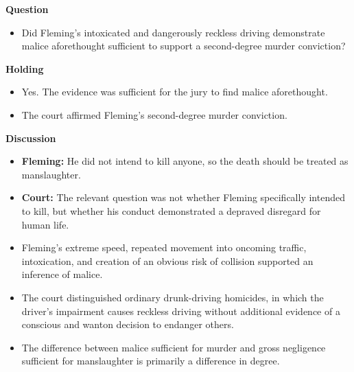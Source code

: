 \documentclass[11pt]{tex/lawoutline}
\begin{document}
{        \textbf{Question}
        \begin{itemize}
            \item Did Fleming's intoxicated and dangerously reckless driving demonstrate malice aforethought sufficient to support a second-degree murder conviction?
        \end{itemize}

        \textbf{Holding}
        \begin{itemize}
            \item Yes. The evidence was sufficient for the jury to find malice aforethought.
            \item The court affirmed Fleming's second-degree murder conviction.
        \end{itemize}

        \textbf{Discussion}
        \begin{itemize}
            \item \textbf{Fleming:} He did not intend to kill anyone, so the death should be treated as manslaughter.
            \item \textbf{Court:} The relevant question was not whether Fleming specifically intended to kill, but whether his conduct demonstrated a depraved disregard for human life.
            \item Fleming's extreme speed, repeated movement into oncoming traffic, intoxication, and creation of an obvious risk of collision supported an inference of malice.
            \item The court distinguished ordinary drunk-driving homicides, in which the driver's impairment causes reckless driving without additional evidence of a conscious and wanton decision to endanger others.
            \item The difference between malice sufficient for murder and gross negligence sufficient for manslaughter is primarily a difference in degree.
        \end{itemize}
    }
\end{document}
